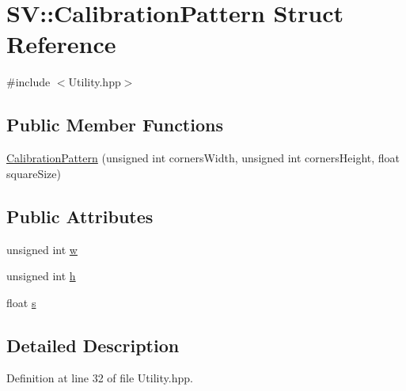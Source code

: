 \hypertarget{struct_s_v_1_1_calibration_pattern}{\section{S\-V\-:\-:Calibration\-Pattern Struct Reference}
\label{struct_s_v_1_1_calibration_pattern}
}


{\ttfamily \#include $<$Utility.\-hpp$>$}

\subsection*{Public Member Functions}
\begin{DoxyCompactItemize}
\item 
\hyperlink{struct_s_v_1_1_calibration_pattern_af5bda0ab3f29d5f00c733b00c764194b}{Calibration\-Pattern} (unsigned int corners\-Width, unsigned int corners\-Height, float square\-Size)
\end{DoxyCompactItemize}
\subsection*{Public Attributes}
\begin{DoxyCompactItemize}
\item 
unsigned int \hyperlink{struct_s_v_1_1_calibration_pattern_a99b723ddb247ba8a45bbae90f72992ee}{w}
\item 
unsigned int \hyperlink{struct_s_v_1_1_calibration_pattern_abcf472770054feb05d37291dbb7af10f}{h}
\item 
float \hyperlink{struct_s_v_1_1_calibration_pattern_a1a2f7fe30888c5f9bb8816d0809aedd3}{s}
\end{DoxyCompactItemize}


\subsection{Detailed Description}


Definition at line 32 of file Utility.\-hpp.



